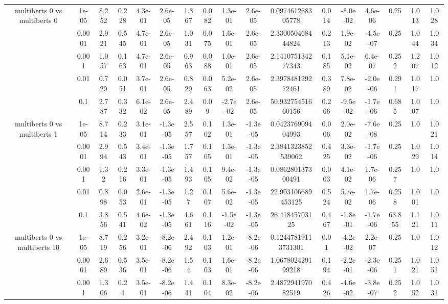 \begin{tabular}{|c|c|c|c|c|c|c|c|c|c|c|c|c|c|c|c|c|}
\hline
\multirow{5}{*}{multiberts 0 vs multiberts 0} & 1e-05 & 8.252 & 0.228 & 4.3e-01 & 2.6e-05 & 1.867 & 0.082 & 1.3e-01 & 2.6e-05 & 0.097461268305778 & 0.014 & -8.0e-02 & 4.6e-06 & 0.25 & 1.013 & 1.028 \\
 & 0.0001 & 2.921 & 0.545 & 4.7e-01 & 2.6e-05 & 1.031 & 0.075 & 1.6e-01 & 2.6e-05 & 2.330050468444824 & 0.213 & 1.9e-02 & -4.5e-07 & 0.25 & 1.044 & 1.034 \\
 & 0.001 & 1.057 & 0.163 & 4.7e-01 & 2.6e-05 & 0.963 & 0.088 & 1.0e-01 & 2.6e-05 & 2.141075134277343 & 0.185 & 5.1e-02 & 6.4e-07 & 0.252 & 1.207 & 1.012 \\
 & 0.01 & 0.729 & 0.051 & 3.7e-01 & 2.6e-05 & 0.829 & 0.063 & 5.2e-02 & 2.6e-05 & 2.397848129272461 & 0.389 & 7.8e-02 & -2.0e-06 & 0.291 & 1.017 & 1.0 \\
 & 0.1 & 2.787 & 0.332 & 6.1e-02 & 2.6e-05 & 2.489 & 0.09 & -2.7e-02 & 2.6e-05 & 50.93275451660156 & 0.266 & -9.5e-02 & -1.7e-06 & 0.685 & 1.007 & 1.0 \\
\hline
\multirow{5}{*}{multiberts 0 vs multiberts 1} & 1e-05 & 8.714 & 0.233 & 3.1e-01 & -1.3e-05 & 2.557 & 0.102 & 1.3e-01 & -1.3e-05 & 0.042376909404993 & 0.006 & 2.0e-02 & -7.6e-08 & 0.25 & 1.0 & 1.021 \\
 & 0.0001 & 2.994 & 0.543 & 3.4e-01 & -1.3e-05 & 1.757 & 0.105 & 1.3e-01 & -1.3e-05 & 2.3841323852539062 & 0.425 & 3.3e-02 & -1.7e-06 & 0.25 & 1.029 & 1.014 \\
 & 0.001 & 1.32 & 0.216 & 3.3e-01 & -1.3e-05 & 1.493 & 0.105 & 9.4e-02 & -1.3e-05 & 0.086280137300491 & 0.003 & 4.1e-02 & 1.7e-06 & 0.257 & 1.0 & 1.0 \\
 & 0.01 & 0.898 & 0.053 & 2.6e-01 & -1.3e-05 & 1.27 & 0.107 & 5.6e-02 & -1.3e-05 & 22.903106689453125 & 0.524 & 5.7e-02 & 1.7e-06 & 0.258 & 1.001 & 1.0 \\
 & 0.1 & 3.856 & 0.541 & 4.6e-02 & -1.3e-05 & 4.661 & 0.116 & -1.5e-02 & -1.3e-05 & 26.41845703125 & 0.467 & -1.8e-01 & -1.7e-06 & 63.855 & 1.121 & 1.011 \\
\hline
\multirow{5}{*}{multiberts 0 vs multiberts 10} & 1e-05 & 8.719 & 0.256 & 3.2e-01 & -8.2e-06 & 2.492 & 0.103 & 1.2e-01 & -8.2e-06 & 0.12447819113731301 & 0.01 & -4.2e-02 & 2.2e-07 & 0.25 & 1.0 & 1.012 \\
 & 0.0001 & 2.689 & 0.536 & 3.5e-01 & -8.2e-06 & 1.54 & 0.103 & 1.6e-01 & -8.2e-06 & 1.067802429199218 & 0.194 & -2.2e-01 & -2.3e-06 & 0.251 & 1.021 & 1.051 \\
 & 0.001 & 1.306 & 0.24 & 3.5e-01 & -8.2e-06 & 1.441 & 0.104 & 8.3e-02 & -8.2e-06 & 2.487294197082519 & 0.426 & -4.6e-02 & -3.8e-07 & 0.252 & 1.052 & 1.031 \\

\end{tabular}

